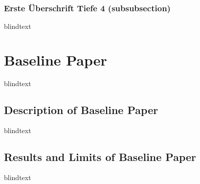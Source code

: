 \subsubsection{Erste Überschrift Tiefe 4 (subsubsection)}
blindtext

\section{Baseline Paper}
blindtext

\subsection{Description of Baseline Paper}
blindtext

\subsection{Results and Limits of Baseline Paper}
blindtext